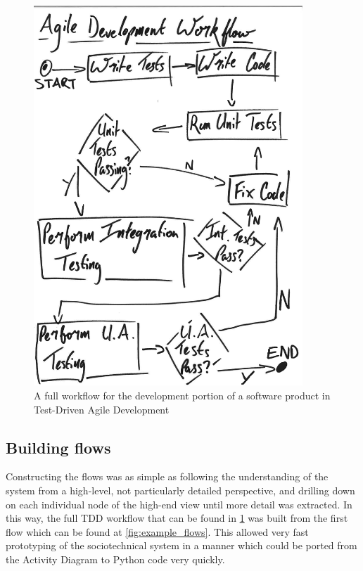 \begin{figure}[p]
    \centering
    \includegraphics[width=0.9\textwidth]{images/Example_agile_flows.pdf}
    \caption{A full workflow for the development portion of a software product in Test-Driven Agile Development}
    \label{fig:agile_workflow}
\end{figure}

\subsection{Building flows}
Constructing the flows was as simple as following the understanding of the system from a high-level, not particularly detailed perspective, and drilling down on each individual node of the high-end view until more detail was extracted. In this way, the full TDD workflow that can be found in \cref{fig:agile_workflow} was built from the first flow which can be found at \cref{fig:example_flows}. This allowed very fast prototyping of the sociotechnical system in a manner which could be ported from the Activity Diagram to Python code very quickly. \par

